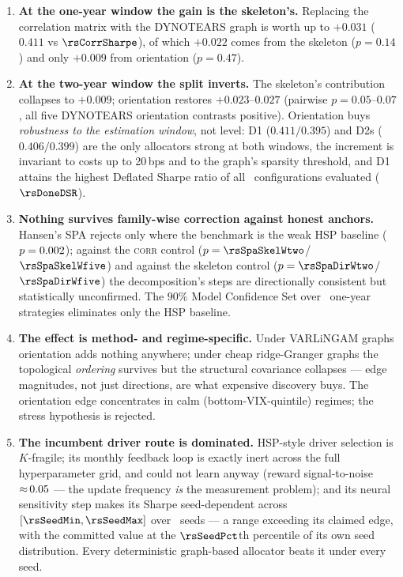 \begin{enumerate}[itemsep=2pt]
  \item \textbf{At the one-year window the gain is the skeleton's.} Replacing
        the correlation matrix with the DYNOTEARS graph is worth up to
        $+0.031$ ($0.411$ vs $\rsCorrSharpe$), of which $+0.022$ comes from
        the skeleton ($p=0.14$) and only $+0.009$ from orientation
        ($p=0.47$).
  \item \textbf{At the two-year window the split inverts.} The skeleton's
        contribution collapses to $+0.009$; orientation restores
        $+0.023$--$0.027$ (pairwise $p=0.05$--$0.07$, all five DYNOTEARS
        orientation contrasts positive). Orientation buys \emph{robustness to
        the estimation window}, not level: D1 ($0.411/0.395$) and D2s
        ($0.406/0.399$) are the only allocators strong at both windows, the
        increment is invariant to costs up to 20\,bps and to the graph's
        sparsity threshold, and D1 attains the highest Deflated Sharpe ratio
        of all \rsNtrials\ configurations evaluated ($\rsDoneDSR$).
  \item \textbf{Nothing survives family-wise correction against honest
        anchors.} Hansen's SPA rejects only where the benchmark is the weak
        HSP baseline ($p=0.002$); against the \textsc{corr}
        control ($p=\rsSpaSkelWtwo$/$\rsSpaSkelWfive$) and against the
        skeleton control ($p=\rsSpaDirWtwo$/$\rsSpaDirWfive$) the
        decomposition's steps are directionally consistent but statistically
        unconfirmed. The $90\%$ Model Confidence Set over \rsMcsUniverse\
        one-year strategies eliminates only the HSP baseline.
  \item \textbf{The effect is method- and regime-specific.} Under VARLiNGAM
        graphs orientation adds nothing anywhere; under cheap ridge-Granger
        graphs the topological \emph{ordering} survives but the structural
        covariance collapses --- edge magnitudes, not just directions, are
        what expensive discovery buys. The orientation edge concentrates in
        calm (bottom-VIX-quintile) regimes; the stress hypothesis is
        rejected.
  \item \textbf{The incumbent driver route is dominated.} HSP-style driver
        selection is $K$-fragile; its monthly feedback loop is exactly inert
        across the full hyperparameter grid, and could not learn anyway
        (reward signal-to-noise ${\approx}\,0.05$ --- the update
        frequency \emph{is} the measurement problem); and its neural
        sensitivity step makes its Sharpe seed-dependent across
        $[\rsSeedMin,\rsSeedMax]$ over \rsSeedN\ seeds --- a range exceeding
        its claimed edge, with the committed value at the $\rsSeedPct$th
        percentile of its own seed distribution. Every deterministic
        graph-based allocator beats it under every seed.
\end{enumerate}

